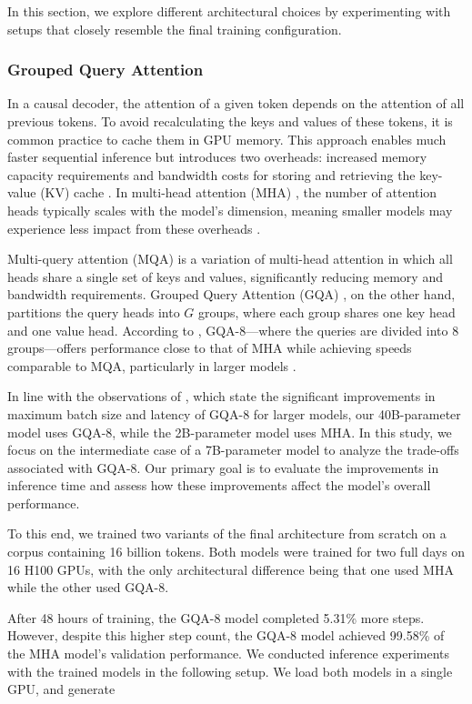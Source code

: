 In this section, we explore different architectural choices by experimenting with setups that closely resemble the final training configuration.

\subsubsection{Grouped Query Attention}
In a causal decoder, the attention of a given token depends on the attention of all previous tokens. To avoid recalculating the keys and values of these tokens, it is common practice to cache them in GPU memory. This approach enables much faster sequential inference but introduces two overheads: increased memory capacity requirements and bandwidth costs for storing and retrieving the key-value (KV) cache \cite{pope2022}. In multi-head attention (MHA) \cite{transformers}, the number of attention heads typically scales with the model's dimension, meaning smaller models may experience less impact from these overheads \cite{gqa}.

Multi-query attention (MQA) \cite{shazeer2019fasttransformerdecodingwritehead} is a variation of multi-head attention in which all heads share a single set of keys and values, significantly reducing memory and bandwidth requirements. Grouped Query Attention (GQA) \cite{gqa}, on the other hand, partitions the query heads into $G$ groups, where each group shares one key head and one value head. According to \citet{gqa}, GQA-8—where the queries are divided into 8 groups—offers performance close to that of MHA while achieving speeds comparable to MQA, particularly in larger models \cite{gqa}.

In line with the observations of \citet{llama2}, which state the significant improvements in maximum batch size and latency of GQA-8 for larger models, our 40B-parameter model uses GQA-8, while the 2B-parameter model uses MHA. In this study, we focus on the intermediate case of a 7B-parameter model to analyze the trade-offs associated with GQA-8. Our primary goal is to evaluate the improvements in inference time and assess how these improvements affect the model's overall performance.

To this end, we trained two variants of the final architecture from scratch on a corpus containing 16 billion tokens. Both models were trained for two full days on 16 H100 GPUs, with the only architectural difference being that one used MHA while the other used GQA-8.

After 48 hours of training, the GQA-8 model completed 5.31\% more steps. However, despite this higher step count, the GQA-8 model achieved 99.58\% of the MHA model's validation performance. We conducted inference experiments with the trained models in the following setup. We load both models in a single GPU, and generate 

